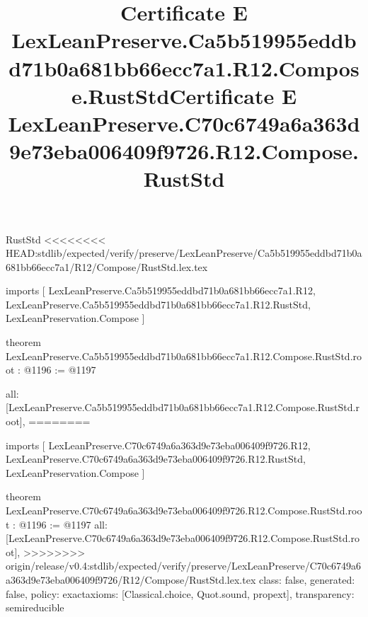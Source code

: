 \begin{lexlean}{RustStd}
<<<<<<<< HEAD:stdlib/expected/verify/preserve/LexLeanPreserve/Ca5b519955eddbd71b0a681bb66ecc7a1/R12/Compose/RustStd.lex.tex
\title{Certificate E LexLeanPreserve.Ca5b519955eddbd71b0a681bb66ecc7a1.R12.Compose.RustStd}
\begin{coremodule}
imports [
  LexLeanPreserve.Ca5b519955eddbd71b0a681bb66ecc7a1.R12,
  LexLeanPreserve.Ca5b519955eddbd71b0a681bb66ecc7a1.R12.RustStd,
  LexLeanPreservation.Compose
]

theorem LexLeanPreserve.Ca5b519955eddbd71b0a681bb66ecc7a1.R12.Compose.RustStd.root : @1196 := @1197 {
  all: [LexLeanPreserve.Ca5b519955eddbd71b0a681bb66ecc7a1.R12.Compose.RustStd.root],
========
\title{Certificate E LexLeanPreserve.C70c6749a6a363d9e73eba006409f9726.R12.Compose.RustStd}
\begin{coremodule}
imports [
  LexLeanPreserve.C70c6749a6a363d9e73eba006409f9726.R12,
  LexLeanPreserve.C70c6749a6a363d9e73eba006409f9726.R12.RustStd,
  LexLeanPreservation.Compose
]

theorem LexLeanPreserve.C70c6749a6a363d9e73eba006409f9726.R12.Compose.RustStd.root : @1196 := @1197 {
  all: [LexLeanPreserve.C70c6749a6a363d9e73eba006409f9726.R12.Compose.RustStd.root],
>>>>>>>> origin/release/v0.4:stdlib/expected/verify/preserve/LexLeanPreserve/C70c6749a6a363d9e73eba006409f9726/R12/Compose/RustStd.lex.tex
  class: false,
  generated: false,
  policy: exact{axioms: [Classical.choice, Quot.sound, propext]},
  transparency: semireducible
}


\end{coremodule}}
\end{coremodule}
\end{lexlean}
